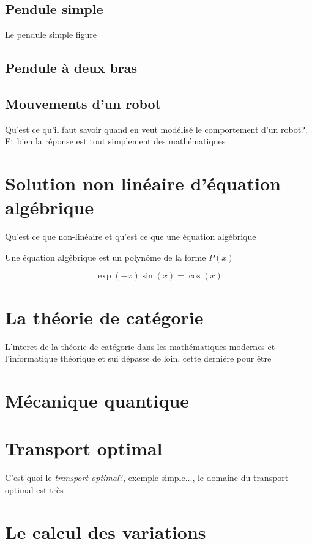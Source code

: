 \documentclass[11pt,fleqn]{book} %
\begin{document}
\subsection{Pendule simple}
Le pendule simple figure
\subsection{Pendule à deux bras}
\subsection{Mouvements d’un robot}
Qu'est ce qu'il faut savoir quand en veut modélisé le comportement
d'un robot?. Et bien la réponse est tout simplement des mathématiques

\section{Solution non linéaire d'équation algébrique}

Qu'est ce que non-linéaire et qu'est ce que une \'equation alg\'ebrique

Une \'equation alg\'ebrique est un polyn\^ome de la forme $P(x)$

\begin{equation}
\exp(-x)\sin(x) = \cos(x)
\end{equation}

%
\section{La théorie de catégorie}
L'interet de la théorie de catégorie dans les mathématiques modernes et l'informatique théorique et sui dépasse de loin, cette derniére pour \^etre
\section{M\'ecanique quantique}
\section{Transport optimal}
C'est quoi le \textit{ transport optimal}?, exemple simple..., le domaine du transport optimal
est très 
\section{Le calcul des variations}
\end{document}
